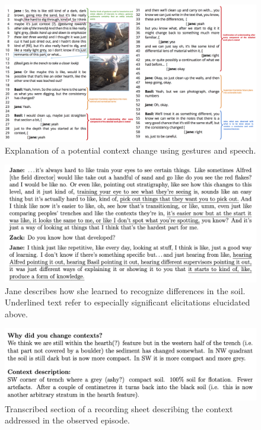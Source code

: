 \documentclass{article}
\begin{document}
\begin{figure}[hbt!]
  \centering
  \includegraphics[width=6in]{../../figures/context-change-discussion.png}
  \caption{Explanation of a potential context change using gestures and
  speech.}\label{fig-context-change-discussion}
\end{figure}

\begin{figure}[hbt!]
  \centering
  \includegraphics[width=6in]{../../figures/training-eye.png}
  \caption{Jane describes how she learned to recognize differences in the
  soil. Underlined text refer to especially significant elicitations
  elucidated above.}\label{fig-training-eye}
\end{figure}

\begin{figure}[hbt!]
  \centering
  \includegraphics[width=6in]{../../figures/context-description-transcribed.png}
  \caption{Transcribed section of a recording sheet describing the context
  addressed in the observed
  episode.}\label{fig-context-description-transcribed}
\end{figure}
\end{document}
